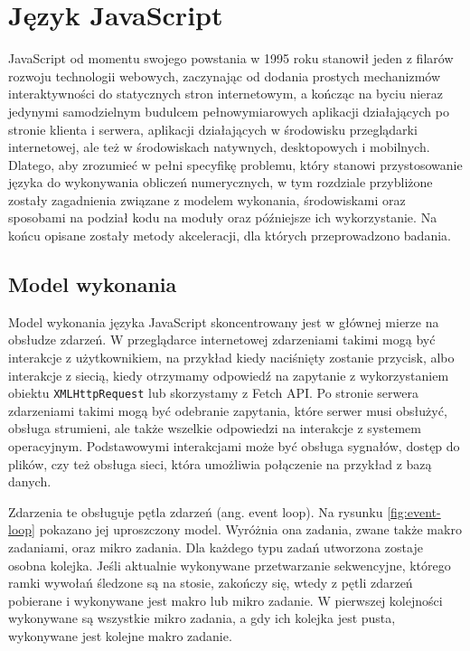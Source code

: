 \chapter{Język JavaScript}

JavaScript od momentu swojego powstania w 1995 roku stanowił jeden z filarów rozwoju technologii webowych, zaczynając od dodania prostych mechanizmów interaktywności do statycznych stron internetowym, a kończąc na byciu nieraz jedynymi samodzielnym budulcem pełnowymiarowych aplikacji działających po stronie klienta i serwera, aplikacji działających w środowisku przeglądarki internetowej, ale też w środowiskach natywnych, desktopowych i mobilnych. Dlatego, aby zrozumieć w pełni specyfikę problemu, który stanowi przystosowanie języka do wykonywania obliczeń numerycznych, w tym rozdziale przybliżone zostały zagadnienia związane z modelem wykonania, środowiskami oraz sposobami na podział kodu na moduły oraz późniejsze ich wykorzystanie. Na końcu opisane zostały metody akceleracji, dla których przeprowadzono badania.



\section{Model wykonania}

Model wykonania języka JavaScript skoncentrowany jest w głównej mierze na obsłudze zdarzeń. W przeglądarce internetowej zdarzeniami takimi mogą być interakcje z użytkownikiem, na przykład kiedy naciśnięty zostanie przycisk, albo interakcje z siecią, kiedy otrzymamy odpowiedź na zapytanie z wykorzystaniem obiektu \lstinline{XMLHttpRequest} lub skorzystamy z Fetch API. Po stronie serwera zdarzeniami takimi mogą być odebranie zapytania, które serwer musi obsłużyć, obsługa strumieni, ale także wszelkie odpowiedzi na interakcje z systemem operacyjnym. Podstawowymi interakcjami może być obsługa sygnałów, dostęp do plików, czy też obsługa sieci, która umożliwia połączenie na przykład z bazą danych.

Zdarzenia te obsługuje pętla zdarzeń (ang. event loop). Na rysunku \ref{fig:event-loop} pokazano jej uproszczony model. Wyróżnia ona zadania, zwane także makro zadaniami, oraz mikro zadania. Dla każdego typu zadań utworzona zostaje osobna kolejka. Jeśli aktualnie wykonywane przetwarzanie sekwencyjne, którego ramki wywołań śledzone są na stosie, zakończy się, wtedy z pętli zdarzeń pobierane i wykonywane jest makro lub mikro zadanie. W pierwszej kolejności wykonywane są wszystkie mikro zadania, a gdy ich kolejka jest pusta, wykonywane jest kolejne makro zadanie.

